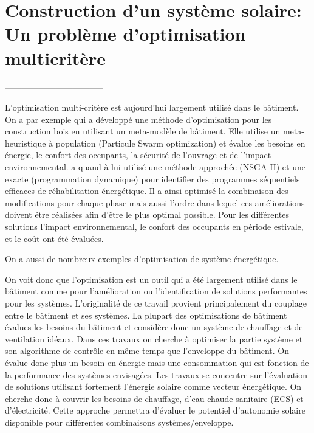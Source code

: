 
\section{Construction d’un système solaire: Un problème d’optimisation multicritère} %
\label{sec:construction_d_un_systeme_solaire_un_probleme_d_optimisation}
-----------------------------------


L’optimisation multi-critère est aujourd’hui largement utilisé dans le bâtiment.
On a par exemple \cite{} qui a développé une méthode d’optimisation pour les
construction bois en utilisant un meta-modèle de bâtiment. Elle utilise un meta-heuristique
à population (Particule Swarm optimization) et évalue les besoins en énergie, le confort des
occupants, la sécurité de l’ouvrage et de l’impact environnemental. \cite{} a quand à lui
utilisé une méthode approchée (NSGA-II) et une exacte (programmation dynamique)
pour identifier des programmes séquentiels efficaces de réhabilitation énergétique.
Il a ainsi optimisé la combinaison des modifications pour chaque phase mais aussi l’ordre
dans lequel ces améliorations doivent être réalisées afin d’être le plus optimal
possible.
Pour les différentes solutions l’impact environnemental, le confort des occupants en
période estivale, et le coût ont été évaluées.



On a aussi de nombreux exemples d’optimisation de système énergétique.


On voit donc que l’optimisation est un outil qui a été largement utilisé dans
le bâtiment comme pour l’amélioration ou l’identification de solutions performantes
pour les systèmes.
L’originalité de ce travail provient principalement du couplage entre le bâtiment
et ses systèmes. La plupart des optimisations de bâtiment évalues les besoins
du bâtiment et considère donc un système de chauffage et de ventilation idéaux.
Dans ces travaux on cherche à optimiser la partie système et son algorithme de
contrôle en même temps que l’enveloppe du bâtiment. On évalue donc plus un besoin
en énergie mais une consommation qui est fonction de la performance des systèmes
envisagées. Les travaux se concentre sur l’évaluation de solutions utilisant fortement
l’énergie solaire comme vecteur énergétique. On cherche donc à couvrir les besoins
de chauffage, d’eau chaude sanitaire (ECS) et d’électricité.
Cette approche permettra d’évaluer le potentiel d’autonomie solaire disponible
pour différentes combinaisons systèmes/enveloppe.

